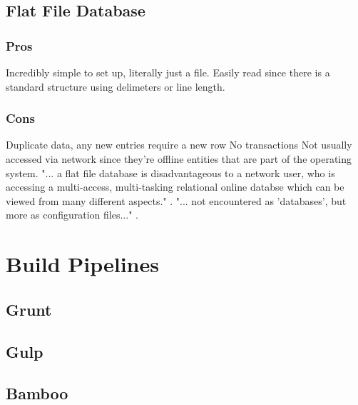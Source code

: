 \documentclass[draftclsnofoot,onecolumn,letterpaper,10pt,compsoc]{IEEEtran}
\begin{document}
        
	\subsection{Flat File Database}
        \subsubsection{Pros}
            Incredibly simple to set up, literally just a file.
            Easily read since there is a standard structure using delimeters or line length.
    
        \subsubsection{Cons}
            Duplicate data, any new entries require a new row
            No transactions
            Not usually accessed via network since they're offline entities that are part of the operating system\cite{Techwalla}.
            "... a flat file database is disadvantageous to a network user, who is accessing a multi-access, multi-tasking relational online databse which can be viewed from many different aspects." \cite{Techwalla}.
            "... not encountered as 'databases', but more as configuration files..." \cite{Techwalla}.


\section{Build Pipelines}
	\subsection{Grunt}
        
    
	\subsection{Gulp}
    
	\subsection{Bamboo}

{}

\end{document}

